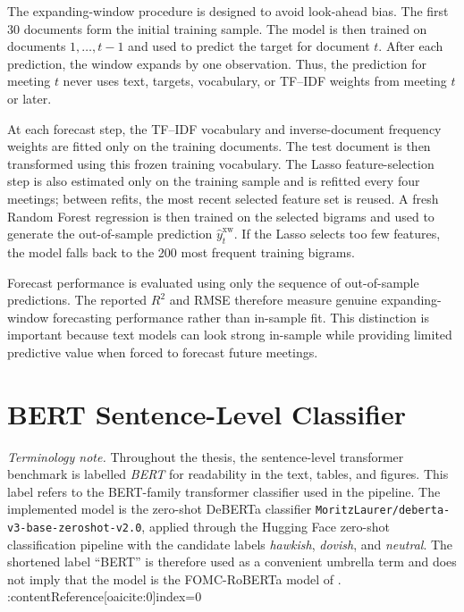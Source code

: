 The expanding-window procedure is designed to avoid look-ahead bias.
The first 30 documents form the initial training sample. The model is
then trained on documents \(1,\dots,t-1\) and used to predict the target
for document \(t\). After each prediction, the window expands by one
observation. Thus, the prediction for meeting \(t\) never uses text,
targets, vocabulary, or TF--IDF weights from meeting \(t\) or later.

At each forecast step, the TF--IDF vocabulary and inverse-document
frequency weights are fitted only on the training documents. The test
document is then transformed using this frozen training vocabulary. The
Lasso feature-selection step is also estimated only on the training
sample and is refitted every four meetings; between refits, the most
recent selected feature set is reused. A fresh Random Forest regression
is then trained on the selected bigrams and used to generate the
out-of-sample prediction \(\hat{y}^{\text{xw}}_t\). If the Lasso selects
too few features, the model falls back to the 200 most frequent training
bigrams.

Forecast performance is evaluated using only the sequence of
out-of-sample predictions. The reported \(R^2\) and RMSE therefore
measure genuine expanding-window forecasting performance rather than
in-sample fit. This distinction is important because text models can
look strong in-sample while providing limited predictive value when
forced to forecast future meetings.

\section{BERT Sentence-Level Classifier}
\label{sec:meth_bert}

\noindent\textit{Terminology note.} Throughout the thesis, the
sentence-level transformer benchmark is labelled \emph{BERT} for
readability in the text, tables, and figures. This label refers to the
BERT-family transformer classifier used in the pipeline. The implemented
model is the zero-shot DeBERTa classifier
\texttt{MoritzLaurer/deberta-v3-base-zeroshot-v2.0}, applied through the
Hugging Face zero-shot classification pipeline with the candidate labels
\emph{hawkish}, \emph{dovish}, and \emph{neutral}. The shortened label
``BERT'' is therefore used as a convenient umbrella term and does not
imply that the model is the FOMC-RoBERTa model of \citet{shah2023}.
:contentReference[oaicite:0]{index=0}

